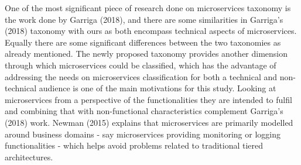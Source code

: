 \documentclass{article}
\begin{document}
One of the most significant piece of research done on microservices taxonomy is the work done by Garriga (2018), and there are some similarities in Garriga's (2018) taxonomy with ours as both encompass technical aspects of microservices. Equally there are some significant differences between the two taxonomies as already mentioned. The newly proposed taxonomy provides another dimension through which microservices could be classified, which has the advantage of addressing the needs on microservices classification for both a technical and non-technical audience is one of the main motivations for this study. Looking at microservices from a perspective of the functionalities they are intended to fulfil and combining that with non-functional characteristics complement Garriga's (2018) work. Newman (2015) explains that microservices are primarily modelled around business domains - say microservices providing monitoring or logging functionalities - which helps avoid problems related to traditional tiered architectures.
\end{document}
